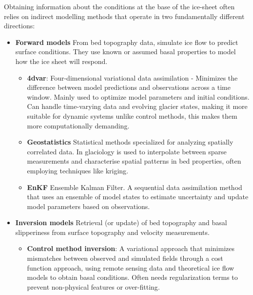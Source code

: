 Obtaining information about the conditions at the base of the ice-sheet often relies on indirect modelling methods that operate in two fundamentally different directions:
\begin{itemize}
    \item\textbf{Forward models}
    From bed topography data, simulate ice flow to predict surface conditions. They use known or assumed basal properties to model how the ice sheet will respond.
    
    \begin{itemize}
           \item\textbf{4dvar}: Four-dimensional variational data assimilation - Minimizes the difference between model predictions and observations across a time window. Mainly used to optimize model parameters and initial conditions\cite{Morlighem_Goldberg_2024}. Can handle time-varying data and evolving glacier states, making it more suitable for dynamic systems unlike control methods, this makes them more computationally demanding\cite{Morlighem_Goldberg_2024}.

            \item\textbf{Geostatistics} Statistical methods specialized for analyzing spatially correlated data. In glaciology is used to interpolate between sparse measurements and characterise spatial patterns in bed properties, often employing techniques like kriging\cite{Mackie_2020}.

            \item\textbf{EnKF} Ensemble Kalman Filter. A sequential data assimilation method that uses an ensemble of model states to estimate uncertainty and update model parameters based on observations\cite{Morlighem_Goldberg_2024}.
    \end{itemize}

    \item\textbf{Inversion models}
    Retrieval (or update) of bed topography and basal slipperiness from surface topography and velocity measurements\cite{deRydt_2013}.

        \begin{itemize}
            \item\textbf{Control method inversion}: A variational approach that minimizes mismatches between observed and simulated fields through a cost function approach, using remote sensing data and theoretical ice flow models to obtain basal conditions\cite{deRydt_2013}. Often needs regularization terms to prevent non-physical features or over-fitting\cite{Morlighem_Goldberg_2024}.


\end{itemize}
\end{itemize}
